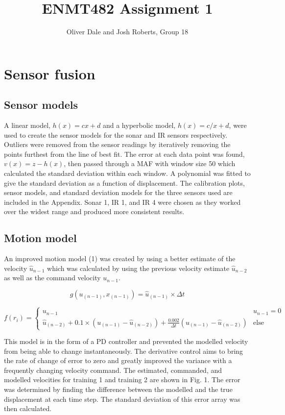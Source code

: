 \documentclass[a4paper,12pt]{article}
\title{ENMT482 Assignment 1}
\author{Oliver Dale and Josh Roberts, Group 18}
\date{}
\begin{document}
\maketitle

\section{Sensor fusion}


\subsection{Sensor models}
A linear model, $h(x)=cx+d$ and a hyperbolic model, $h(x)=c/x+d$, were used to create the sensor models for the sonar and IR sensors respectively. Outliers were removed from the sensor readings by iteratively removing the points furthest from the line of best fit. The error at each data point was found, $v(x)=z-h(x)$, then passed through a MAF with window size 50 which calculated the standard deviation within each window. A polynomial was fitted to give the standard deviation as a function of displacement. The calibration plots, sensor models, and standard deviation models for the three sensors used are included in the Appendix. Sonar 1, IR 1, and IR 4 were chosen as they worked over the widest range and produced more consistent results.
 

\subsection{Motion model}
An improved motion model (1) was created by using a better estimate of the velocity $\hat{u}_{n-1}$ which was calculated by using the previous velocity estimate $\hat{u}_{n-2}$ as well as the command velocity $u_{n-1}$.

\begin{equation}
g(u_{(n-1)}, x_{(n-1)} )=\hat{u}_{(n-1)}×\Delta t 
\end{equation}

\begin{equation}
        f(r_i)=
        \left\{ \begin{array}{ll}
            u_{n-1} &u_{n-1}=0\\
            \hat{u}_{(n-2)}+0.1×(u_{(n-1)}-\hat{u}_{(n-2)} )+\frac{0.002}{\Delta t} (u_{(n-1)}-\hat{u}_{(n-2)} ) &\text{else}
        \end{array} \right.
	\end{equation}

This model is in the form of a PD controller and prevented the modelled velocity from being able to change instantaneously. The derivative control aims to bring the rate of change of error to zero and greatly improved the variance with a frequently changing velocity command. The estimated, commanded, and modelled velocities for training 1 and training 2 are shown in Fig. 1. The error was determined by finding the difference between the modelled and the true displacement at each time step. The standard deviation of this error array was then calculated. 
\end{document}
